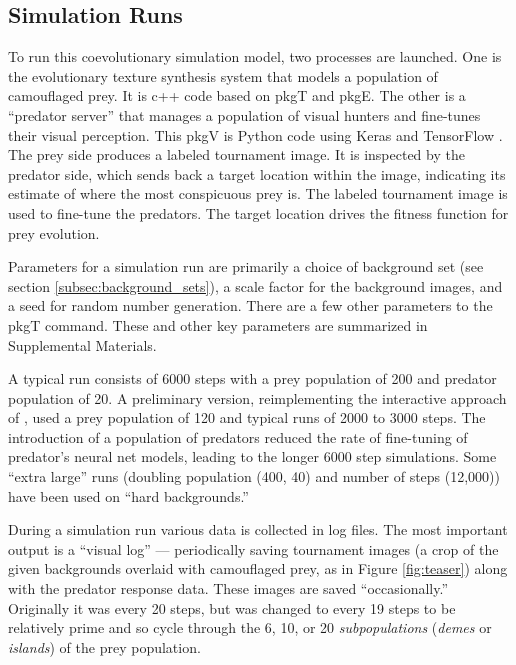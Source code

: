 \documentclass[acmtog,
    anonymous,
    review
    ]{acmart}
\newcommand{\jargon}[1]{\textit{#1}}
\newcommand{\texsyn}[0]{pkgT}
\newcommand{\lazypredator}[0]{pkgE}
\newcommand{\predatoreye}[0]{pkgV}
\begin{document}
\subsection{Simulation Runs}
To run this coevolutionary simulation model, two processes are launched. One is the evolutionary texture synthesis system that models a population of camouflaged prey. It is c++ code based on \texsyn{} and \lazypredator{}. The other is a “predator server” that manages a population of visual hunters and fine-tunes their visual perception. This \predatoreye{} is Python code using Keras \cite{chollet_keras_2015} and TensorFlow \cite{tensorflow_whitepaper_2015}. The prey side produces a labeled tournament image. It is inspected by the predator side, which sends back a target location within the image, indicating its estimate of where the most conspicuous prey is. The labeled tournament image is used to fine-tune the predators. The target location drives the fitness function for prey evolution.
\par
Parameters for a simulation run are primarily a choice of background set (see section \ref{subsec:background_sets}), a scale factor for the background images, and a seed for random number generation. There are a few other parameters to the \texsyn{} command. These and other key parameters are summarized in Supplemental Materials.
\par
A typical run consists of 6000 steps with a prey population of 200 and predator population of 20. A preliminary version, reimplementing the interactive approach of \citet{reynolds_iec_2011}, used a prey population of 120 and typical runs of 2000 to 3000 steps. The introduction of a population of predators reduced the rate of fine-tuning of predator's neural net models, leading to the longer 6000 step simulations. Some “extra large” runs (doubling population (400, 40) and number of steps (12,000)) have been used on “hard backgrounds.”
\par
During a simulation run various data is collected in log files. The most important output is a “visual log” — periodically saving tournament images (a crop of the given backgrounds overlaid with camouflaged prey, as in Figure \ref{fig:teaser}) along with the predator response data. These images are saved “occasionally.” Originally it was every 20 steps, but was changed to every 19 steps to be relatively prime and so cycle through the 6, 10, or 20 \jargon{subpopulations} (\jargon{demes} or \jargon{islands}) of the prey population.
\par
\end{document}
